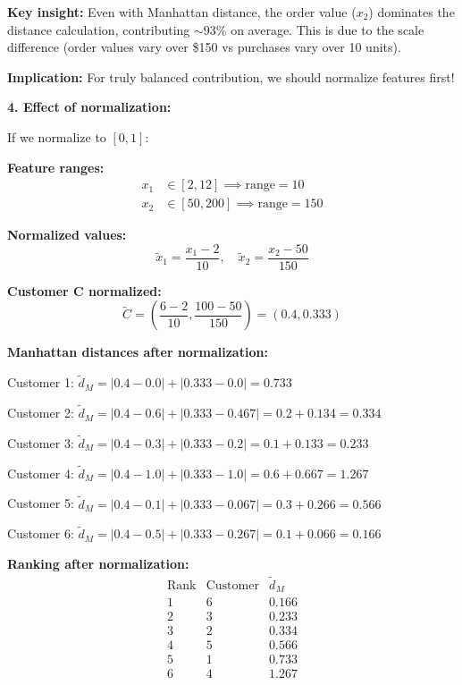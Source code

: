 \documentclass[12pt]{article}
\begin{document}
\begin{computation}
\textbf{Key insight:} Even with Manhattan distance, the order value (\(x_2\)) dominates the distance calculation, contributing \(\sim 93\%\) on average. This is due to the scale difference (order values vary over \$150 vs purchases vary over 10 units).

\textbf{Implication:} For truly balanced contribution, we should normalize features first!

\textbf{4. Effect of normalization:}

If we normalize to \([0,1]\):

\textbf{Feature ranges:}
\begin{align*}
x_1 &\in [2, 12] \implies \text{range} = 10 \\
x_2 &\in [50, 200] \implies \text{range} = 150
\end{align*}

\textbf{Normalized values:}
\[
\tilde{x}_1 = \frac{x_1 - 2}{10}, \quad \tilde{x}_2 = \frac{x_2 - 50}{150}
\]

\textbf{Customer C normalized:}
\[
\tilde{C} = \left(\frac{6-2}{10}, \frac{100-50}{150}\right) = (0.4, 0.333)
\]

\textbf{Manhattan distances after normalization:}

Customer 1: \(\tilde{d}_M = |0.4 - 0.0| + |0.333 - 0.0| = 0.733\)

Customer 2: \(\tilde{d}_M = |0.4 - 0.6| + |0.333 - 0.467| = 0.2 + 0.134 = 0.334\)

Customer 3: \(\tilde{d}_M = |0.4 - 0.3| + |0.333 - 0.2| = 0.1 + 0.133 = 0.233\)

Customer 4: \(\tilde{d}_M = |0.4 - 1.0| + |0.333 - 1.0| = 0.6 + 0.667 = 1.267\)

Customer 5: \(\tilde{d}_M = |0.4 - 0.1| + |0.333 - 0.067| = 0.3 + 0.266 = 0.566\)

Customer 6: \(\tilde{d}_M = |0.4 - 0.5| + |0.333 - 0.267| = 0.1 + 0.066 = 0.166\)

\textbf{Ranking after normalization:}
\[
\begin{array}{c|c|c}
\text{Rank} & \text{Customer} & \tilde{d}_M \\
\hline
1 & 6 & 0.166 \\
2 & 3 & 0.233 \\
3 & 2 & 0.334 \\
4 & 5 & 0.566 \\
5 & 1 & 0.733 \\
6 & 4 & 1.267 \\
\end{array}
\]


\end{computation}
\end{document}
